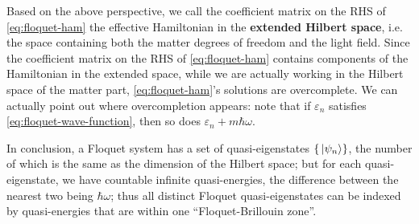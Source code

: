 \documentclass[hyperref, a4paper]{article}
\newcommand*{\concept}[1]{{\textbf{#1}}}
\begin{document}
Based on the above perspective, 
we call the coefficient matrix on the RHS of \eqref{eq:floquet-ham}
the effective Hamiltonian in the \concept{extended Hilbert space}, 
i.e. the space containing both the matter degrees of freedom 
and the light field.
Since the coefficient matrix on the RHS of \eqref{eq:floquet-ham} 
contains components of the Hamiltonian in the extended space, 
while we are actually working in the Hilbert space of the matter part,
\eqref{eq:floquet-ham}'s solutions are overcomplete.
We can actually point out where overcompletion appears:
note that if $\varepsilon_n$ satisfies \eqref{eq:floquet-wave-function},
then so does $\varepsilon_n + m \hbar \omega$.

In conclusion, a Floquet system has a set of quasi-eigenstates $\{ \ket*{\psi_n} \}$,
the number of which is the same as 
the dimension of the Hilbert space;
but for each quasi-eigenstate,
we have countable infinite quasi-energies,
the difference between the nearest two being $\hbar \omega$;
thus all distinct Floquet quasi-eigenstates can be indexed 
by quasi-energies that are within one ``Floquet-Brillouin zone''.

\printbibliography
\end{document}
